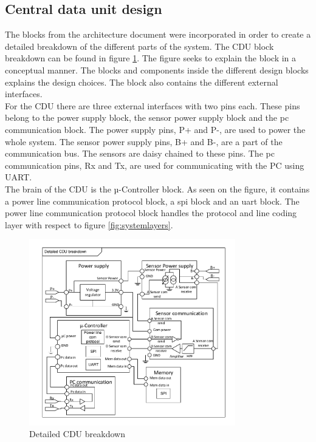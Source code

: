 \subsection{Central data unit design}
The blocks from the architecture document were incorporated in order to create a detailed breakdown of the different parts of the system. The CDU block breakdown can be found in figure \ref{fig:detailedCDU}. The figure seeks to explain the block in a conceptual manner. The blocks and components inside the different design blocks explains the design choices. The block also contains the different external interfaces. \\
For the CDU there are three external interfaces with two pins each. These pins belong to the power supply block, the sensor power supply block and the pc communication block. The power supply pins, P+ and P-, are used to power the whole system. The sensor power supply pins, B+ and B-, are a part of the communication bus. The sensors are daisy chained to these pins. The pc communication pins, Rx and Tx, are used for communicating with the PC using UART.\\
The brain of the CDU is the µ-Controller block. As seen on the figure, it contains a power line communication protocol block, a spi block and an uart block. The power line communication protocol block handles the protocol and line coding layer with respect to figure \ref{fig:systemlayers}.
\begin{figure}[H]
	\centering
	\includegraphics[width=0.8\textwidth]{billeder/11ProjectDescription/detailedCDU}
	\caption{Detailed CDU breakdown}
	\label{fig:detailedCDU}
\end{figure}
